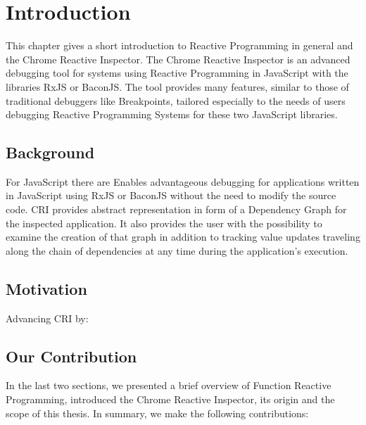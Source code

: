 \chapter{Introduction} \label{ch:Introduction}
This chapter gives a short introduction to Reactive Programming in general and the Chrome Reactive Inspector. The Chrome Reactive Inspector is an advanced debugging tool for systems using Reactive Programming in JavaScript with the libraries RxJS or BaconJS. The tool provides many features, similar to those of traditional debuggers like Breakpoints, tailored especially to the needs of users debugging Reactive Programming Systems for these two JavaScript libraries.

\section{Background}

For JavaScript there are 
Enables advantageous debugging for applications written in JavaScript using RxJS or BaconJS without the need to modify the source code.
CRI provides abstract representation in form of a Dependency Graph for the inspected application. It also provides the user with the possibility to examine the creation of that graph in addition to tracking value updates traveling along the chain of dependencies at any time during the application's execution.%

\section{Motivation}
Advancing CRI by:


\section{Our Contribution}

In the last two sections, we presented a brief overview of Function Reactive Programming, introduced the Chrome Reactive Inspector, its origin and the scope of this thesis.
In summary, we make the following contributions:

